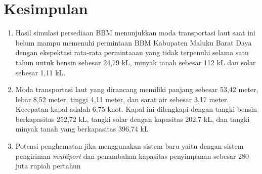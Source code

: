 \section{Kesimpulan}
\label{sec:kesimpulan}

\begin{enumerate}
    \item Hasil simulasi persediaan BBM menunjukkan moda transportasi laut saat ini belum mampu memenuhi permintaan BBM Kabupaten Maluku Barat Daya dengan ekspektasi rata-rata permintaaan yang tidak terpenuhi selama satu tahun untuk bensin sebesar 24,79 kL, minyak tanah sebesar 112 kL dan solar sebesar 1,11 kL.
    \item Moda transportasi laut yang dirancang  memiliki panjang sebesar 53,42 meter, lebar 8,52 meter, tinggi 4,11 meter, dan sarat air sebesar 3,17 meter. Kecepatan kapal adalah 6,75 knot. Kapal ini dilengkapi dengan tangki bensin berkapasitas 252,72 kL, tangki solar dengan kapasitas 202,7 kL, dan tangki minyak tanah yang berkapasitas 396,74 kL
    \item Potensi penghematan jika menggunakan sistem baru yaitu dengan sistem pengiriman \emph{multiport} dan penambahan kapasitas penyimpanan sebesar 280 juta rupiah pertahun
\end{enumerate}